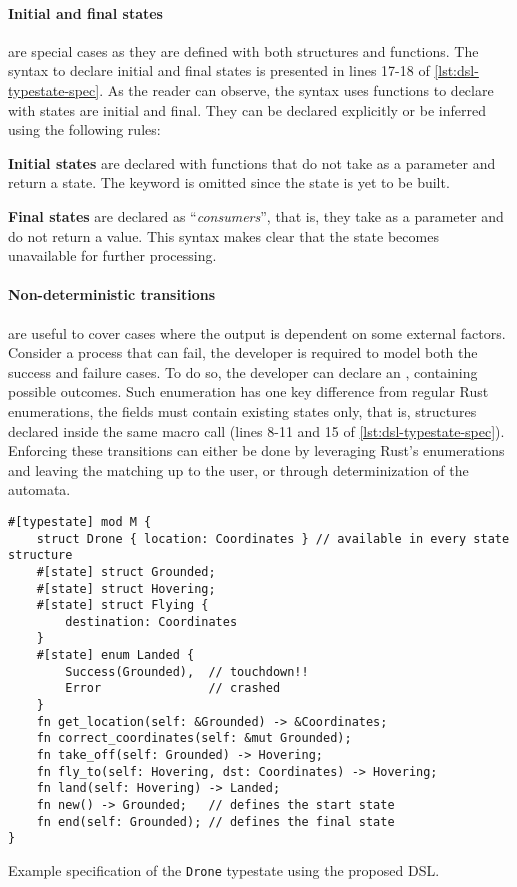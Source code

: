 \paragraph{Initial and final states} are special cases as they are defined with both structures and functions.
The syntax to declare initial and final states is presented in lines 17-18 of \autoref{lst:dsl-typestate-spec}.
As the reader can observe, the syntax uses functions to declare with states are initial and final.
They can be declared explicitly or be inferred using the following rules:
\begin{compactitem}
    \item \textbf{Initial states} are declared with functions that do not take  as a parameter and return a state.
    The  keyword is omitted since the state is yet to be built.
    \item \textbf{Final states} are declared as “\emph{consumers}”, that is, they take  as a parameter and do not return a value.
    This syntax makes clear that the state becomes unavailable for further processing.
\end{compactitem}

\paragraph{Non-deterministic transitions} are useful to cover cases where the output is dependent on some external factors.
Consider a process that can fail, the developer is required to model both the success and failure cases.
To do so, the developer can declare an , containing possible outcomes.
Such enumeration has one key difference from regular Rust enumerations, the fields must contain existing states only,
that is, structures declared inside the same macro call (lines 8-11 and 15 of \autoref{lst:dsl-typestate-spec}).
Enforcing these transitions can either be done by leveraging Rust's enumerations and leaving the matching up to the user,
or through determinization of the automata.

\begin{listing}
    \centering
    \begin{verbatim}
#[typestate] mod M {
    struct Drone { location: Coordinates } // available in every state structure
    #[state] struct Grounded;
    #[state] struct Hovering;
    #[state] struct Flying {
        destination: Coordinates
    }
    #[state] enum Landed {
        Success(Grounded),  // touchdown!!
        Error               // crashed
    }
    fn get_location(self: &Grounded) -> &Coordinates;
    fn correct_coordinates(self: &mut Grounded);
    fn take_off(self: Grounded) -> Hovering;
    fn fly_to(self: Hovering, dst: Coordinates) -> Hovering;
    fn land(self: Hovering) -> Landed;
    fn new() -> Grounded;   // defines the start state
    fn end(self: Grounded); // defines the final state
}
    \end{verbatim}
    \caption{
        Example specification of the \texttt{Drone} typestate using the proposed DSL.
    }
    \label{lst:dsl-typestate-spec}
\end{listing}


